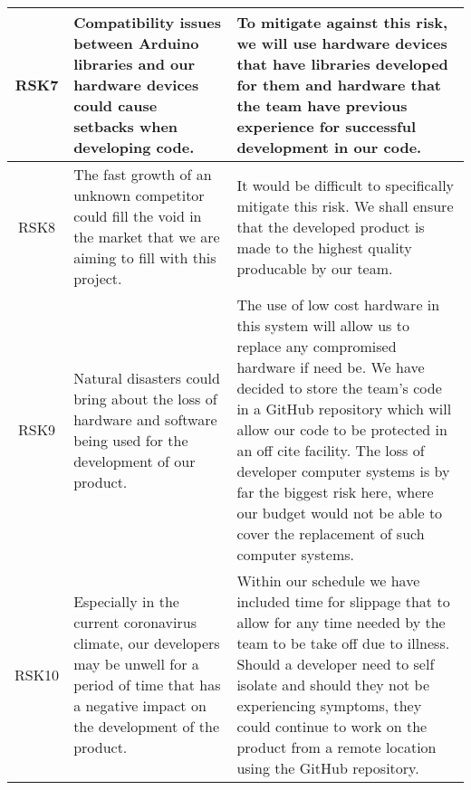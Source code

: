 \begin{xltabular}[H]{\textwidth}{c | X | X}
    \midrule

    RSK7

    &

    Compatibility issues between Arduino libraries and our hardware devices could cause setbacks when developing code.

    &

    To mitigate against this risk, we will use hardware devices that have libraries developed for them and hardware that the team have previous experience for successful development in our code.\\

    \midrule

    RSK8

    &

    The fast growth of an unknown competitor could fill the void in the market that we are aiming to fill with this project.

    &

    It would be difficult to specifically mitigate this risk. We shall ensure that the developed product is made to the highest quality producable by our team.\\

    \midrule

    RSK9

    &

    Natural disasters could bring about the loss of hardware and software being used for the development of our product.

    &

    The use of low cost hardware in this system will allow us to replace any compromised hardware if need be. We have decided to store the team's code in a GitHub repository which will allow our code to be protected in an off cite facility. The loss of developer computer systems is by far the biggest risk here, where our budget would not be able to cover the replacement of such computer systems.\\

    \midrule

    RSK10

    &

    Especially in the current coronavirus climate, our developers may be unwell for a period of time that has a negative impact on the development of the product.

    &

    Within our schedule we have included time for slippage that to allow for any time needed by the team to be take off due to illness. Should a developer need to self isolate and should they not be experiencing symptoms, they could continue to work on the product from a remote location using the GitHub repository.\\


\end{xltabular}
